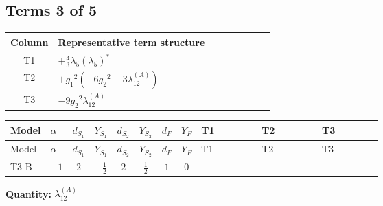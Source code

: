 \documentclass[8pt]{article}
\begin{document}
\begin{landscape}
\subsection*{Terms 3 of 5}
\begin{center}
\begin{tabular}{@{}c >{\raggedright\arraybackslash}p{0.82\linewidth}@{}}
\toprule
Column & Representative term structure \\
\midrule
T1 & \(\displaystyle +\frac{4}{3} {\lambda_5} \left({\lambda_5}\right)^{*}\) \\
\midrule
T2 & \(\displaystyle +{g_1}^2 \left(-6 {g_2}^2-3 {\lambda_{12}^{(A)}}\right)\) \\
\midrule
T3 & \(\displaystyle -9 {g_2}^2 {\lambda_{12}^{(A)}}\) \\
\midrule
\bottomrule
\end{tabular}
\end{center}
\smallskip
\tiny
\begin{longtable}{@{}llcccccc >{\raggedright\arraybackslash}p{0.21\linewidth} >{\raggedright\arraybackslash}p{0.21\linewidth} >{\raggedright\arraybackslash}p{0.21\linewidth}@{}}
\toprule
Model & $\alpha$ & $d_{S_1}$ & $Y_{S_1}$ & $d_{S_2}$ & $Y_{S_2}$ & $d_F$ & $Y_F$ & T1 & T2 & T3 \\
\midrule
\endfirsthead
\toprule
Model & $\alpha$ & $d_{S_1}$ & $Y_{S_1}$ & $d_{S_2}$ & $Y_{S_2}$ & $d_F$ & $Y_F$ & T1 & T2 & T3 \\
\midrule
\endhead
T3-B & $-1$ & $2$ & $-\frac{1}{2}$ & $2$ & $\frac{1}{2}$ & $1$ & $0$ & \scriptsize\adjustbox{max width=\linewidth}{$\begin{gathered} +\frac{4}{3} {\lambda_5} \left({\lambda_5}\right)^{*}\end{gathered}$} & \scriptsize\adjustbox{max width=\linewidth}{$\begin{gathered} +{g_1}^2 \left(-6 {g_2}^2-3 {\lambda_{12}^{(A)}}\right)\end{gathered}$} & \scriptsize\adjustbox{max width=\linewidth}{$\begin{gathered} -9 {g_2}^2 {\lambda_{12}^{(A)}}\end{gathered}$} \\
\midrule
\bottomrule
\end{longtable}
\clearpage
\noindent\textbf{Quantity: }$\lambda_{12}^{(A)}$\par\smallskip

\end{landscape}
\end{document}
